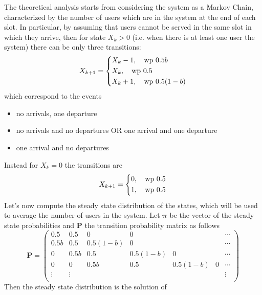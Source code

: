 \documentclass[10pt]{article}
\begin{document}
The theoretical analysis starts from considering the system as a Markov Chain, characterized by the number of users which are in the system at the end of each slot. In particular, by assuming that users cannot be served in the same slot in which they arrive, then for state $X_k > 0$ (i.e. when there is at least one user the system) there can be only three transitions:
\begin{equation}
X_{k+1} = 
\begin{dcases}
	X_k - 1, \quad \mbox{wp } 0.5 b \\
	X_k , \quad \mbox{wp } 0.5 \\
	X_k + 1, \quad \mbox{wp } 0.5(1- b) \\
\end{dcases}
\end{equation}
which correspond to the events
\begin{itemize}
\item no arrivals, one departure
\item no arrivals and no departures OR one arrival and one departure
\item one arrival and no departures
\end{itemize}
Instead for $X_k = 0$ the transitions are
\begin{equation}
X_{k+1} = 
\begin{dcases}
	0, \quad \mbox{wp } 0.5 \\
	1, \quad \mbox{wp } 0.5 \\
\end{dcases}
\end{equation}
Let's now compute the steady state distribution of the states, which will be used to average the number of users in the system. Let $\boldsymbol{\pi}$ be the vector of the steady state probabilities and $\mathbf{P}$ the transition probability matrix as follows
\begin{equation}
\mathbf{P} = 
\begin{pmatrix}
	0.5 	& 0.5 	& 0 		& 0			& 	 		&	& \cdots \\
	0.5b 	& 0.5 	& 0.5(1-b) 	& 0 		& 			&	& \cdots \\
	0 		& 0.5b 	& 0.5 		& 0.5(1-b) 	& 0 		&	& \cdots \\
	0 		& 0 	& 0.5b 		& 0.5 		& 0.5(1-b) 	& 0 & \cdots \\
	\vdots 	& \vdots & 			&  			& 			& 	& \vdots \\
\end{pmatrix}
\end{equation} 
Then the steady state distribution is the solution of
\end{document}
